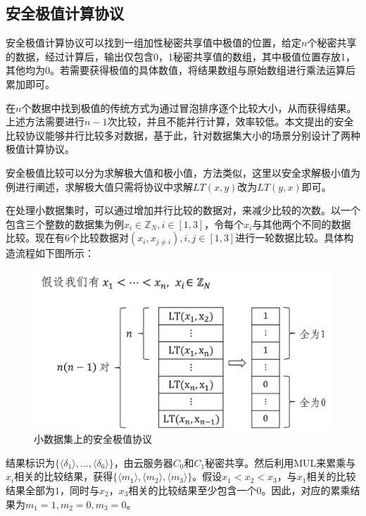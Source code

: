 \subsection{安全极值计算协议}
\label{s3-secureminimum}
安全极值计算协议可以找到一组加性秘密共享值中极值的位置，给定$ n $个秘密共享的数据，经过计算后，输出仅包含0，1秘密共享值的数组，其中极值位置存放1，其他均为0。若需要获得极值的具体数值，将结果数组与原始数组进行乘法运算后累加即可。

在$n$个数据中找到极值的传统方式为通过冒泡排序逐个比较大小，从而获得结果。上述方法需要进行$n-1$次比较，并且不能并行计算，效率较低。本文提出的安全比较协议能够并行比较多对数据，基于此，针对数据集大小的场景分别设计了两种极值计算协议。

安全极值比较可以分为求解极大值和极小值，方法类似，这里以安全求解极小值为例进行阐述，求解极大值只需将协议中求解$LT(x,y)$改为$LT(y,x)$即可。

在处理小数据集时，可以通过增加并行比较的数据对，来减少比较的次数。以一个包含三个整数的数据集为例$x_i \in \mathbb{Z}_N, i\in[1,3]$，令每个$x_i$与其他两个不同的数据比较。现在有6个比较数据对$(x_i, x_{j\neq i}), i,j \in [1,3] $进行一轮数据比较。具体构造流程如下图所示：

\begin{figure}[htbp]
	\centering
	\includegraphics[scale=0.7]{img/fig4.png}%
	\caption{小数据集上的安全极值协议}
	\label{smins}
\end{figure}

结果标识为$\{\langle\delta_1\rangle,...,\langle\delta_6\rangle\}$，由云服务器$C_0$和$C_1$秘密共享。然后利用MUL来累乘与$x_i$相关的比较结果，获得$\{\langle m_1 \rangle,\langle m_2 \rangle,\langle m_3\rangle\}$。假设$x_1<x_2<x_3$，与$x_1$相关的比较结果全部为$1$，同时与$x_2$，$x_3$相关的比较结果至少包含一个$0$。因此，对应的累乘结果为$m_1=1, m_2=0, m_3=0$。


